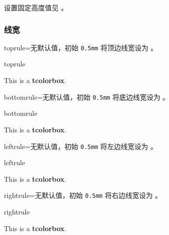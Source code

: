 设置固定高度值见 。


\clearpage
\subsubsection{线宽}
\begin{docTcbKey}{toprule}{=}{无默认值，初始 \texttt{0.5mm}}
  将顶边线宽设为 。
\begin{exdispExample}{toprule}

\begin{tcolorbox}[toprule=3mm]
This is a \textbf{tcolorbox}.
\end{tcolorbox}
\end{exdispExample}
\end{docTcbKey}


\begin{docTcbKey}{bottomrule}{=}{无默认值，初始 \texttt{0.5mm}}
  将底边线宽设为 。
\begin{exdispExample}{bottomrule}

\begin{tcolorbox}[bottomrule=3mm]
This is a \textbf{tcolorbox}.
\end{tcolorbox}
\end{exdispExample}
\end{docTcbKey}

\begin{docTcbKey}{leftrule}{=}{无默认值，初始 \texttt{0.5mm}}
  将左边线宽设为 。
\begin{exdispExample}{leftrule}

\begin{tcolorbox}[leftrule=3mm]
This is a \textbf{tcolorbox}.
\end{tcolorbox}
\end{exdispExample}
\end{docTcbKey}


\begin{docTcbKey}{rightrule}{=}{无默认值，初始 \texttt{0.5mm}}
  将右边线宽设为 。
\begin{exdispExample}{rightrule}

\begin{tcolorbox}[rightrule=3mm]
This is a \textbf{tcolorbox}.
\end{tcolorbox}
\end{exdispExample}
\end{docTcbKey}

